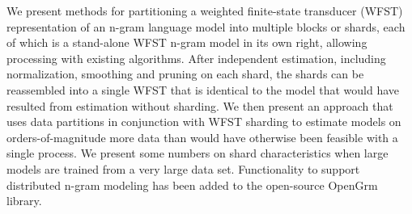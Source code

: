 We present methods for partitioning a weighted finite-state transducer (WFST) representation of an n-gram language model into multiple blocks or shards, each of which is a stand-alone WFST n-gram model in its own right, allowing processing with existing algorithms. After independent estimation, including normalization, smoothing and pruning on each shard, the shards can be reassembled into a single WFST that is identical to the model that would have resulted from estimation without sharding. We then present an approach that uses data partitions in conjunction with WFST sharding to estimate models on orders-of-magnitude more data than would have otherwise been feasible with a single process. We present some numbers on shard characteristics when large models are trained from a very large data set. Functionality to support distributed n-gram modeling has been added to the open-source OpenGrm library.
